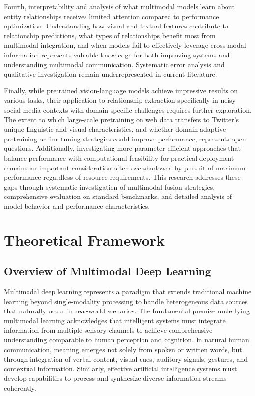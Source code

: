 \documentclass[12pt,a4paper]{report}
\begin{document}
Fourth, interpretability and analysis of what multimodal models learn about entity relationships receives limited attention compared to performance optimization. Understanding how visual and textual features contribute to relationship predictions, what types of relationships benefit most from multimodal integration, and when models fail to effectively leverage cross-modal information represents valuable knowledge for both improving systems and understanding multimodal communication. Systematic error analysis and qualitative investigation remain underrepresented in current literature.

Finally, while pretrained vision-language models achieve impressive results on various tasks, their application to relationship extraction specifically in noisy social media contexts with domain-specific challenges requires further exploration. The extent to which large-scale pretraining on web data transfers to Twitter's unique linguistic and visual characteristics, and whether domain-adaptive pretraining or fine-tuning strategies could improve performance, represents open questions. Additionally, investigating more parameter-efficient approaches that balance performance with computational feasibility for practical deployment remains an important consideration often overshadowed by pursuit of maximum performance regardless of resource requirements. This research addresses these gaps through systematic investigation of multimodal fusion strategies, comprehensive evaluation on standard benchmarks, and detailed analysis of model behavior and performance characteristics.

\chapter{Theoretical Framework}

\section{Overview of Multimodal Deep Learning}

Multimodal deep learning represents a paradigm that extends traditional machine learning beyond single-modality processing to handle heterogeneous data sources that naturally occur in real-world scenarios. The fundamental premise underlying multimodal learning acknowledges that intelligent systems must integrate information from multiple sensory channels to achieve comprehensive understanding comparable to human perception and cognition. In natural human communication, meaning emerges not solely from spoken or written words, but through integration of verbal content, visual cues, auditory signals, gestures, and contextual information. Similarly, effective artificial intelligence systems must develop capabilities to process and synthesize diverse information streams coherently.
\end{document}
